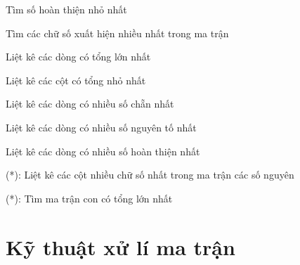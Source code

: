 \begin{problem}
    Tìm số hoàn thiện nhỏ nhất
\end{problem}
\begin{problem}
    Tìm các chữ số xuất hiện nhiều nhất trong ma trận
\end{problem}
\begin{problem}
    Liệt kê các dòng có tổng lớn nhất
\end{problem}
\begin{problem}
    Liệt kê các cột có tổng nhỏ nhất
\end{problem}
\begin{problem}
    Liệt kê các dòng có nhiều số chẵn nhất
\end{problem}
\begin{problem}
    Liệt kê các dòng có nhiều số nguyên tố nhất
\end{problem}
\begin{problem}
    Liệt kê các dòng có nhiều số hoàn thiện nhất
\end{problem}
\begin{problem}
    (*): Liệt kê các cột nhiều chữ số nhất trong ma trận các số nguyên
\end{problem}
\begin{problem}
    (*): Tìm ma trận con có tổng lớn nhất
\end{problem}


\section{Kỹ thuật xử lí ma trận}

